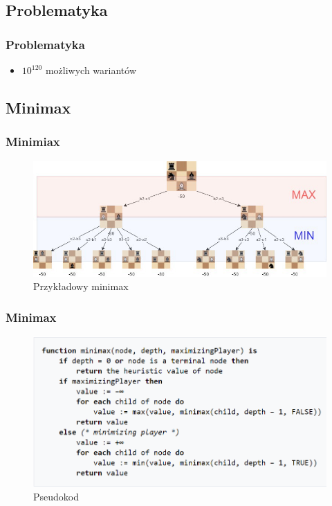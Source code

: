 \documentclass[polish,envcountsect,10pt]{beamer}
\begin{document}
        \subsection{Problematyka}
            \begin{frame}
               \frametitle{Problematyka}
               \begin{itemize}
                    \item $10^{120}$ możliwych wariantów
               \end{itemize}
            \end{frame}
        \subsection{Minimax}
            \begin{frame}
                \frametitle{Minimiax}
                \begin{figure}[]
                    \centering
                    \includegraphics[width=\textwidth]{images/minimax}
                    \caption{Przykładowy minimax}
                \end{figure}
            \end{frame}
            \begin{frame}
                \frametitle{Minimax}
                \begin{figure}[]
                    \centering
                    \includegraphics[width=\textwidth]{images/minimax_code}
                    \caption{Pseudokod}
                \end{figure}
            \end{frame}
\end{document}
